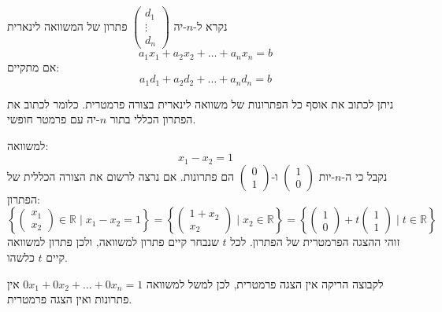 \documentclass{tstextbook}
\begin{document}
\begin{definition}
נקרא ל-\(n\)-יה \(\begin{pmatrix} d_{1}\\\vdots\\d_{n}\end{pmatrix}\) פתרון של המשוואה לינארית 
$$a_{1}x_{1}+a_{2}x_{2}+\dots+a_{n}x_{n}=b$$
אם מתקיים:
$$a_{1}d_{1}+a_{2}d_{2}+\dots+a_{n}d_{n}=b$$

\end{definition}
\begin{definition}
ניתן לכתוב את אוסף כל הפתרונות של משוואה לינארית בצורה פרמטרית. כלומר לכתוב את הפתרון הכללי בתור \(n\)-יה עם פרמטר חופשי. 

\end{definition}
\begin{example}
למשוואה:
$$x_{1}-x_{2}=1$$
נקבל כי ה-\(n\)-יות \(\begin{pmatrix}1 \\0\end{pmatrix}\) ו-\(\begin{pmatrix}0 \\ 1\end{pmatrix}\) הם פתרונות. אם נרצה לרשום את הצורה הכללית של הפתרון:
$$\left\{  \begin{pmatrix}x_{1}\\x_{2}\end{pmatrix}  \in \mathbb{R}\mid x_{1}-x_{2}=1\right\}=\left\{  \begin{pmatrix}1+x_{2}\\x_{2}\end{pmatrix}\mid x_{2} \in \mathbb{R}  \right\}=\left\{  \begin{pmatrix}1\\0\end{pmatrix}+t\begin{pmatrix}1\\1
\end{pmatrix}\mid t \in \mathbb{R}  \right\}$$
זוהי ההצגה הפרמטרית של הפתרון. לכל \(t\) שנבחר קיים פתרון למשוואה, ולכן פתרון למשוואה קיים \(t\) כלשהו. 

\end{example}
\begin{remark}
לקבוצה הריקה אין הצגה פרמטרית, לכן למשל למשוואה \(0x_{1}+0x_{2}+\dots+0x_{n}=1\) אין פתרונות ואין הצגה פרמטרית.

\end{remark}
\end{document}
